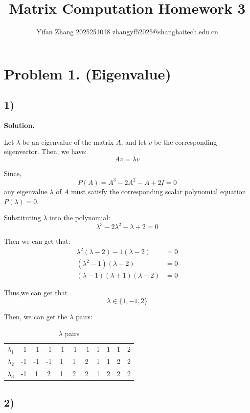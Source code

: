 \documentclass{article}
\title{\Huge Matrix Computation Homework 3}
\author{\normalsize Yifan Zhang  2025251018  zhangyf52025@shanghaitech.edu.cn}
\newcommand{\0}{{\mathbf{0}}} %
\begin{document}
\maketitle

\section*{Problem 1. (Eigenvalue)}

\subsection*{1)}

\textbf{Solution.}

Let $\lambda$ be an eigenvalue of the matrix $A$,
and let $v$ be the corresponding eigenvector.
Then, we have:
$$ Av = \lambda v $$

Since,
$$
P(A) = A^3 - 2A^2 - A + 2I = 0
$$
any eigenvalue $\lambda$ of $A$ must satisfy the corresponding scalar polynomial equation $P(\lambda) = 0$.

Substituting $\lambda$ into the polynomial:
$$
\lambda^3 - 2\lambda^2 - \lambda + 2 = 0
$$

Then we can get that:
\begin{align*}
\lambda^2(\lambda - 2) - 1(\lambda - 2) &= 0 \\
(\lambda^2 - 1)(\lambda - 2) &= 0 \\
(\lambda - 1)(\lambda + 1)(\lambda - 2) &= 0
\end{align*}

Thus,we can get that
$$
\lambda \in \{1, -1, 2\}
$$

Then, we can get the $\lambda$ pairs:

\begin{table}[h]
\centering
\begin{tabular}{|c|c|c|c|c|c|c|c|c|c|c|}
  \hline
  $\lambda_1$ & -1 & -1 & -1 & -1 & -1 & -1 & 1 & 1 & 1 & 2 \\
  $\lambda_2$ & -1 & -1 & -1 & 1  & 1  & 2  & 1 & 1  & 2  & 2 \\
  $\lambda_3$ & -1 & 1  & 2  & 1  & 2  & 2  & 1 & 2 & 2 & 2 \\
  \hline
\end{tabular}
\caption{$\lambda$ pairs}
\label{tab:basic_example}
\end{table}

\subsection*{2)}
\end{document}
